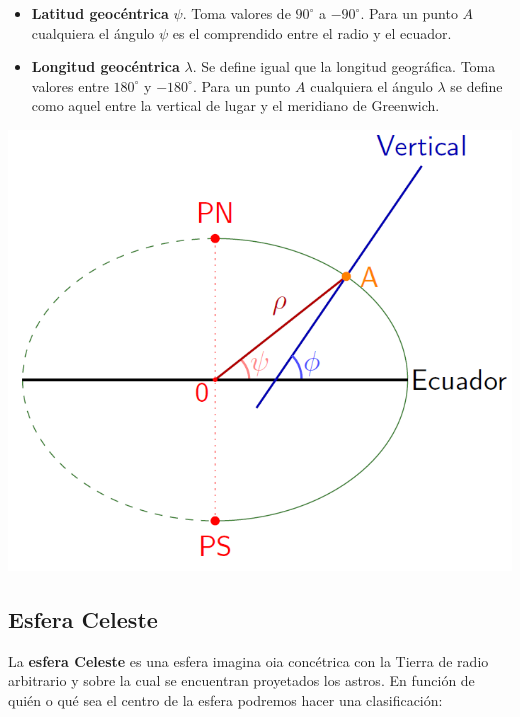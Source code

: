 \begin{itemize}
	      \begin{minipage}{.5\textwidth}
		      \begin{itemize}
			      \item \textbf{Latitud geocéntrica} $\psi$. Toma valores de $90^\circ$ a $-90^\circ$. Para un punto $A$ cualquiera el ángulo $\psi$ es el comprendido entre el radio y el ecuador.
			      \item \textbf{Longitud geocéntrica} $\lambda$. Se define igual que la longitud geográfica. Toma valores entre $180^\circ$ y $-180^\circ$. Para un punto $A$ cualquiera el ángulo $\lambda$ se define como aquel entre la vertical de lugar y el meridiano de Greenwich.
		      \end{itemize}
	      \end{minipage}	\hfill
	      \begin{minipage}{0.5\textwidth} \centering
		      \includegraphics[scale=0.42]{Cuerpo/Imagenes/01_Coordenadas.png}
	      \end{minipage}

\end{itemize}

\subsection{Esfera Celeste}

La \textbf{esfera Celeste} es una esfera imagina oia concétrica con la Tierra de radio arbitrario y sobre la cual se encuentran proyetados los astros. En función de quién o qué sea el centro de la esfera podremos hacer una clasificación: 

